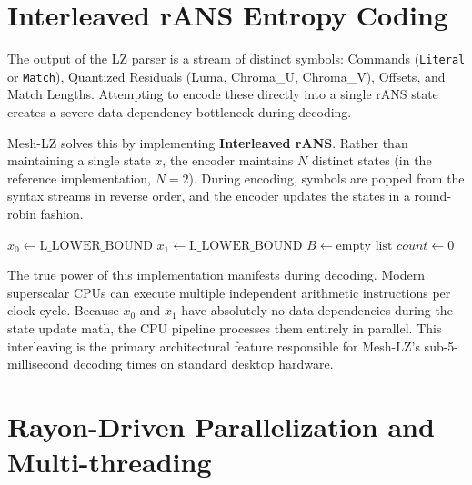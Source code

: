 \section{Interleaved rANS Entropy Coding}

The output of the LZ parser is a stream of distinct symbols: Commands (\texttt{Literal} or \texttt{Match}), Quantized Residuals (Luma, Chroma\_U, Chroma\_V), Offsets, and Match Lengths. Attempting to encode these directly into a single rANS state creates a severe data dependency bottleneck during decoding.

Mesh-LZ solves this by implementing \textbf{Interleaved rANS}. Rather than maintaining a single state $x$, the encoder maintains $N$ distinct states (in the reference implementation, $N=2$). During encoding, symbols are popped from the syntax streams in reverse order, and the encoder updates the states in a round-robin fashion.

\begin{algorithm}[H]
\SetAlgoLined
{}
 $x_0 \gets \text{L\_LOWER\_BOUND}$\;
 $x_1 \gets \text{L\_LOWER\_BOUND}$\;
 $B \gets \text{empty list}$\;
 $count \gets 0$\;
 
 \;
 \caption{Interleaved rANS Encoder}
\end{algorithm}

The true power of this implementation manifests during decoding. Modern superscalar CPUs can execute multiple independent arithmetic instructions per clock cycle. Because $x_0$ and $x_1$ have absolutely no data dependencies during the state update math, the CPU pipeline processes them entirely in parallel. This interleaving is the primary architectural feature responsible for Mesh-LZ's sub-5-millisecond decoding times on standard desktop hardware.

\section{Rayon-Driven Parallelization and Multi-threading}

